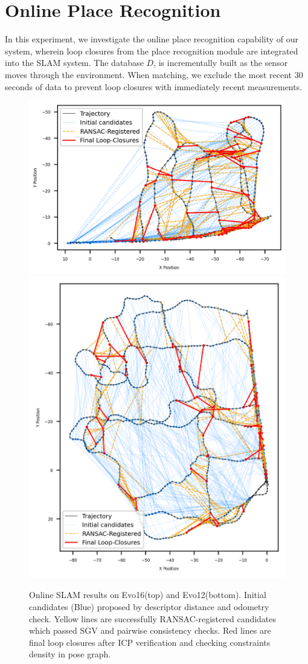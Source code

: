 \section{Online Place Recognition}
\label{sec:exp_online_slam}
In this experiment, we investigate the online place recognition capability of our system, wherein loop closures from the place recognition module are integrated into the SLAM system. The database $D$, is incrementally built as the sensor moves through the environment. When matching, we exclude the most recent 30 seconds of data to prevent loop closures with immediately recent measurements.

\begin{figure}[htbp]
  \centering
  \includegraphics[width=0.8\columnwidth]{pics/exp_2_1_evo16_online.png}
  \includegraphics[width=0.8\columnwidth]{pics/exp_2_1_evo12_online.png}
  \caption{Online SLAM results on Evo16(top) and Evo12(bottom). Initial candidates (Blue) proposed by descriptor distance and odometry check. Yellow lines are successfully RANSAC-registered candidates which passed SGV and pairwise consistency checks. Red lines are final loop closures after ICP verification and checking constraints density in pose graph.}
  \label{fig:exp_2_1_online_place_recognition}
\end{figure}
